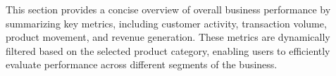 This section provides a concise overview of overall business performance by summarizing key metrics, including customer activity, transaction volume, product movement, and revenue generation. These metrics are dynamically filtered based on the selected product category, enabling users to efficiently evaluate performance across different segments of the business.